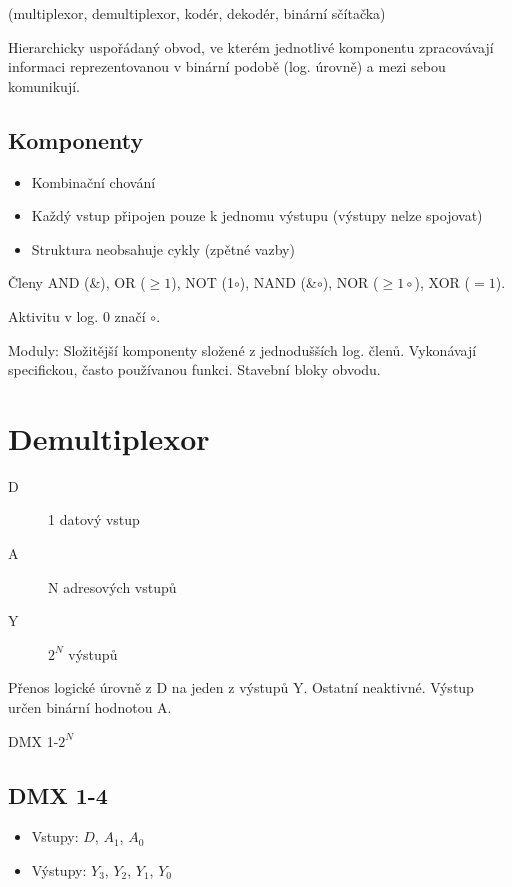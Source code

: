 \documentclass[a4paper, 11pt]{report}
\begin{document}
(multiplexor, demultiplexor, kodér, dekodér, binární sčítačka)

Hierarchicky uspořádaný obvod, ve kterém jednotlivé komponentu zpracovávají informaci reprezentovanou v binární podobě (log. úrovně) a mezi sebou komunikují.

\subsection{Komponenty}
\begin{itemize}
	\item Kombinační chování
	\item Každý vstup připojen pouze k jednomu výstupu (výstupy nelze spojovat)
	\item Struktura neobsahuje cykly (zpětné vazby)
\end{itemize}

Členy AND (\&), OR ($\geq{}1$), NOT (1$\circ$), NAND (\&$\circ$), NOR ($\geq{}1\circ$), XOR ($=1$).

Aktivitu v log. 0 značí $\circ$.

Moduly: Složitější komponenty složené z jednodušších log. členů. Vykonávají specifickou, často používanou funkci. Stavební bloky obvodu.

\section{Demultiplexor}

\begin{description}
	\item[D] 1 datový vstup
	\item[A] N adresových vstupů
	\item[Y] $2^N$ výstupů
\end{description}

Přenos logické úrovně z D na jeden z výstupů Y. Ostatní neaktivné. Výstup určen binární hodnotou A.

DMX 1-$2^N$

\subsection{DMX 1-4}

\begin{itemize}
	\item Vstupy: $D$, $A_1$, $A_0$
	\item Výstupy: $Y_3$, $Y_2$, $Y_1$, $Y_0$
\end{itemize}
\end{document}
